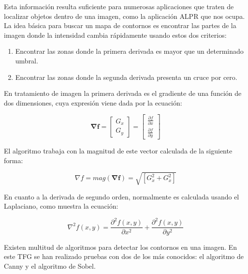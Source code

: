 Esta información resulta suficiente para numerosas aplicaciones que traten de localizar objetos dentro de una imagen, como la aplicación \ac{ALPR} que nos ocupa.\\

La idea básica para buscar un mapa de contornos es encontrar las partes de la imagen donde la intensidad cambia rápidamente usando estos dos criterios:

\begin{enumerate}
\item Encontrar las zonas donde la primera derivada es mayor que un determinado umbral.
\item Encontrar las zonas donde la segunda derivada presenta un cruce por cero.
\end{enumerate}


En tratamiento de imagen la primera derivada es el gradiente de una función de dos dimensiones, cuya expresión viene dada por la ecuación:

\begin{equation}
\boldsymbol{\nabla f}= \left[ \begin{array}{c} G_{x} \\ G_{y}  \end{array} \right] =  \left[ \begin{array}{c} \frac{\partial f}{\partial x} \\ \frac{\partial f}{\partial y}  \end{array} \right]
 \label{ecuacion1}
\end{equation}

El algoritmo trabaja con la magnitud de este vector calculada de la siguiente forma:

\begin{equation}
\nabla f=mag( \boldsymbol{\nabla f})=\sqrt{[G_{x}^{2}+G_{x}^{2}]}
\end{equation}

En cuanto a la derivada de segundo orden, normalmente es calculada usando el Laplaciano, como muestra la ecuación:

\begin{equation}
\nabla^{2}f(x,y)=\frac{\partial ^{2} f(x,y)}{\partial x^{2}} + \frac{\partial ^{2} f(x,y)}{\partial y^{2}}
\end{equation}





Existen multitud de algoritmos para detectar los contornos en una imagen. En este \ac{TFG} se han realizado pruebas con dos de los más conocidos: el algoritmo de Canny y el algoritmo de Sobel.

